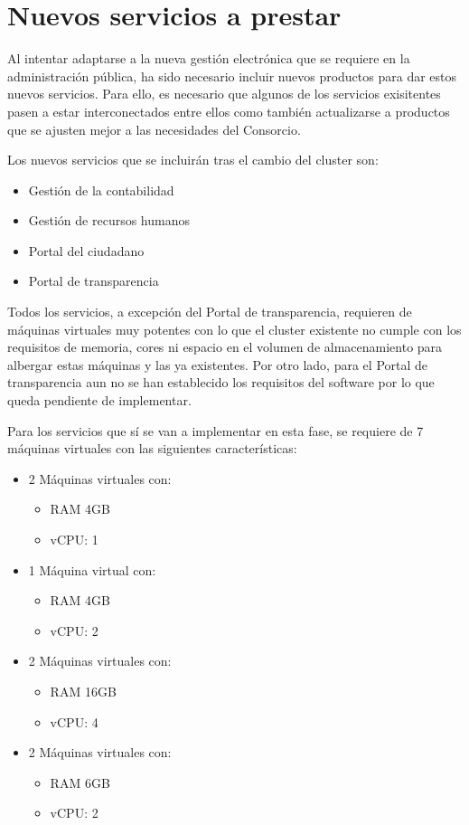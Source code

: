 \documentclass[12pt,a4paper,titlepage,twoside]{report}
\begin{document}
\section{Nuevos servicios a prestar}
Al intentar adaptarse a la nueva gestión electrónica que se requiere en la administración pública, ha sido necesario incluir nuevos productos para dar estos nuevos servicios. Para ello, es necesario que algunos de los servicios exisitentes pasen a estar interconectados entre ellos como también actualizarse a productos que se ajusten mejor a las necesidades del Consorcio. 
\par
Los nuevos servicios que se incluirán tras el cambio del cluster son:
\begin{itemize}
    \item Gestión de la contabilidad
    \item Gestión de recursos humanos
    \item Portal del ciudadano
    \item Portal de transparencia
\end{itemize}
Todos los servicios, a excepción del Portal de transparencia, requieren de máquinas virtuales muy potentes con lo que el cluster existente no cumple con los requisitos de memoria, cores ni espacio en el volumen de almacenamiento para albergar estas máquinas y las ya existentes. Por otro lado, para el Portal de transparencia aun no se han establecido los requisitos del software por lo que queda pendiente de implementar.
\par
Para los servicios que sí se van a implementar en esta fase, se requiere de 7 máquinas virtuales con las siguientes características:
\begin{itemize}
    \item 2 Máquinas virtuales con:
    \begin{itemize}
        \item RAM 4GB
        \item vCPU: 1
    \end{itemize}
    \item 1 Máquina virtual con:
    \begin{itemize}
        \item RAM 4GB
        \item vCPU: 2
    \end{itemize}
    \item 2 Máquinas virtuales con:
    \begin{itemize}
        \item RAM 16GB
        \item vCPU: 4
    \end{itemize}
    \item 2 Máquinas virtuales con:
    \begin{itemize}
        \item RAM 6GB
        \item vCPU: 2
    \end{itemize}
    
\end{itemize}
\end{document}
